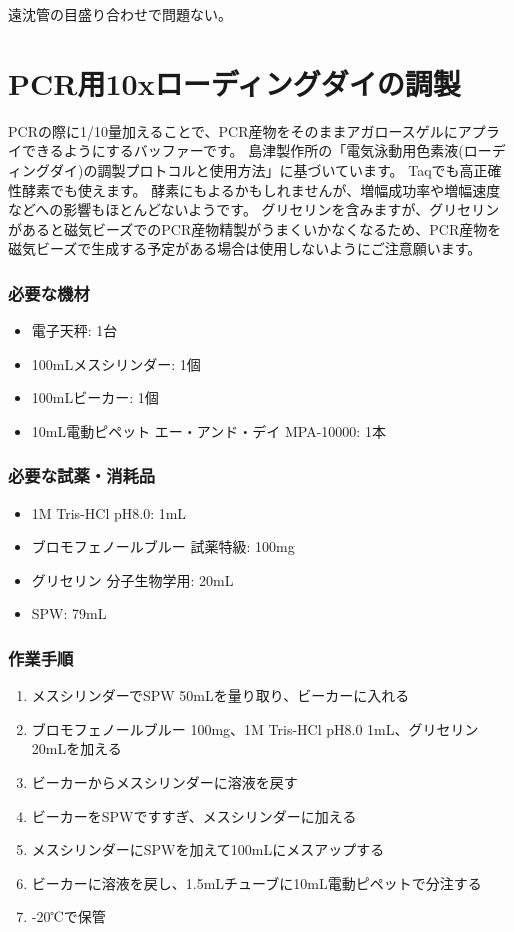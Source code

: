 \documentclass[titlepage,10pt,a4paper]{jsbook}
\begin{document}
遠沈管の目盛り合わせで問題ない。

\section{PCR用10xローディングダイの調製}\label{making10xloadingdye}

PCRの際に1/10量加えることで、PCR産物をそのままアガロースゲルにアプライできるようにするバッファーです。
島津製作所の「電気泳動用色素液(ローディングダイ)の調製プロトコルと使用方法」に基づいています。
Taqでも高正確性酵素でも使えます。
酵素にもよるかもしれませんが、増幅成功率や増幅速度などへの影響もほとんどないようです。
グリセリンを含みますが、グリセリンがあると磁気ビーズでのPCR産物精製がうまくいかなくなるため、PCR産物を磁気ビーズで生成する予定がある場合は使用しないようにご注意願います。

\subsubsection{必要な機材}
\begin{itemize}
\item 電子天秤: 1台
\item 100mLメスシリンダー: 1個
\item 100mLビーカー: 1個
\item 10mL電動ピペット エー・アンド・デイ MPA-10000: 1本
\end{itemize}

\subsubsection{必要な試薬・消耗品}
\begin{itemize}
\item 1M Tris-HCl pH8.0: 1mL
\item ブロモフェノールブルー 試薬特級: 100mg
\item グリセリン 分子生物学用: 20mL
\item SPW: 79mL
\end{itemize}

\subsubsection{作業手順}
\begin{enumerate}
\item メスシリンダーでSPW 50mLを量り取り、ビーカーに入れる
\item ブロモフェノールブルー 100mg、1M Tris-HCl pH8.0 1mL、グリセリン20mLを加える
\item ビーカーからメスシリンダーに溶液を戻す
\item ビーカーをSPWですすぎ、メスシリンダーに加える
\item メスシリンダーにSPWを加えて100mLにメスアップする
\item ビーカーに溶液を戻し、1.5mLチューブに10mL電動ピペットで分注する
\item -20℃で保管
\end{enumerate}
\end{document}
